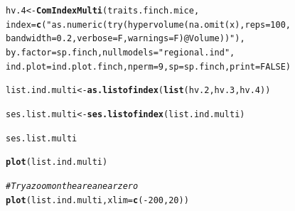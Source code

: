 \documentclass[12pt]{article}\usepackage[]{graphicx}\usepackage[]{color}
\makeatletter
\newcommand{\hlnum}[1]{\textcolor[rgb]{0.686,0.059,0.569}{#1}}%
\newcommand{\hlstr}[1]{\textcolor[rgb]{0.192,0.494,0.8}{#1}}%
\newcommand{\hlcom}[1]{\textcolor[rgb]{0.678,0.584,0.686}{\textit{#1}}}%
\newcommand{\hlopt}[1]{\textcolor[rgb]{0,0,0}{#1}}%
\newcommand{\hlstd}[1]{\textcolor[rgb]{0.345,0.345,0.345}{#1}}%
\newcommand{\hlkwb}[1]{\textcolor[rgb]{0.69,0.353,0.396}{#1}}%
\newcommand{\hlkwc}[1]{\textcolor[rgb]{0.333,0.667,0.333}{#1}}%
\newcommand{\hlkwd}[1]{\textcolor[rgb]{0.737,0.353,0.396}{\textbf{#1}}}%
\newenvironment{kframe}{%
 \def\at@end@of@kframe{}%
 \ifinner\ifhmode%
  \def\at@end@of@kframe{\end{minipage}}%
  \begin{minipage}{\columnwidth}%
 \fi\fi%
 \def\FrameCommand##1{\hskip\@totalleftmargin \hskip-\fboxsep
 \colorbox{shadecolor}{##1}\hskip-\fboxsep
     \hskip-\linewidth \hskip-\@totalleftmargin \hskip\columnwidth}%
 \MakeFramed {\advance\hsize-\width
   \@totalleftmargin\z@ \linewidth\hsize
   \@setminipage}}%
 {\par\unskip\endMakeFramed%
 \at@end@of@kframe}
\newenvironment{knitrout}{}{} %
\makeatother
\begin{document}
\begin{knitrout}
\begin{kframe}
{\ttfamily\noindent\bfseries\color{errorcolor}{\#\# Error: objet 's' introuvable}}\begin{alltt}
\hlstd{hv.4}\hlkwb{<-}\hlkwd{ComIndexMulti}\hlstd{(traits.finch.mice,}
             \hlkwc{index} \hlstd{=} \hlkwd{c}\hlstd{(}\hlstr{"as.numeric(try(hypervolume(na.omit(x), reps = 100, 
                 bandwidth = 0.2, verbose = F, warnings = F)@Volume))"}\hlstd{),}
             \hlkwc{by.factor} \hlstd{= sp.finch,} \hlkwc{nullmodels} \hlstd{=} \hlstr{"regional.ind"}\hlstd{,}
             \hlkwc{ind.plot} \hlstd{= ind.plot.finch,} \hlkwc{nperm} \hlstd{=} \hlnum{9}\hlstd{,} \hlkwc{sp} \hlstd{= sp.finch,} \hlkwc{print} \hlstd{=} \hlnum{FALSE}\hlstd{)}
\end{alltt}


{\ttfamily\noindent\bfseries\color{errorcolor}{\#\# Error: objet 's' introuvable}}\begin{alltt}
\hlstd{list.ind.multi}\hlkwb{<-}\hlkwd{as.listofindex}\hlstd{(}\hlkwd{list}\hlstd{(hv.2, hv.3, hv.4))}
\end{alltt}


{\ttfamily\noindent\bfseries\color{errorcolor}{\#\# Error: objet 'hv.2' introuvable}}\begin{alltt}
\hlstd{ses.list.multi}\hlkwb{<-}\hlkwd{ses.listofindex}\hlstd{(list.ind.multi)}
\end{alltt}


{\ttfamily\noindent\bfseries\color{errorcolor}{\#\# Error: objet 'list.ind.multi' introuvable}}\begin{alltt}
\hlstd{ses.list.multi}
\end{alltt}


{\ttfamily\noindent\bfseries\color{errorcolor}{\#\# Error: objet 'ses.list.multi' introuvable}}\end{kframe}
\end{knitrout}

\begin{knitrout}
\color{fgcolor}\begin{kframe}
\begin{alltt}
\hlkwd{plot}\hlstd{(list.ind.multi)}
\end{alltt}


{\ttfamily\noindent\bfseries\color{errorcolor}{\#\# Error: erreur d'évaluation de l'argument 'x' lors de la sélection d'une méthode pour la fonction 'plot' : Erreur : objet 'list.ind.multi' introuvable}}\begin{alltt}
\hlcom{#Try a zoom on the area near zero}
\hlkwd{plot}\hlstd{(list.ind.multi,} \hlkwc{xlim} \hlstd{=} \hlkwd{c}\hlstd{(}\hlopt{-}\hlnum{200}\hlstd{,}\hlnum{20}\hlstd{))}
\end{alltt}


{\ttfamily\noindent\bfseries\color{errorcolor}{\#\# Error: erreur d'évaluation de l'argument 'x' lors de la sélection d'une méthode pour la fonction 'plot' : Erreur : objet 'list.ind.multi' introuvable}}\end{kframe}
\end{knitrout}
\end{document}
